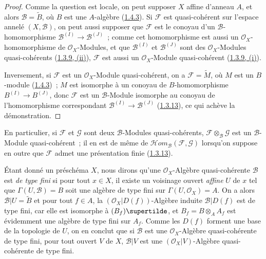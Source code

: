 \begin{proof}
Comme la question est locale, on peut supposer $X$ affine d'anneau $A$, et
alors $\mathscr{B}=\widetilde{B}$, où $B$ est une $A$-algèbre
(\hyperref[I.1.4.3-fr]{1.4.3}). Si $\mathscr{F}$ est quasi-cohérent sur
l'espace annelé $(X,\mathscr{B})$, on peut aussi supposer que
$\mathscr{F}$ est le conoyau d'un $\mathscr{B}$-homomorphisme
$\mathscr{B}^{(I)}\to\mathscr{B}^{(J)}$~; comme cet homomorphisme est
aussi un $\mathscr{O}_X$-homomorphisme de $\mathscr{O}_X$-Modules, et que
$\mathscr{B}^{(I)}$ et $\mathscr{B}^{(J)}$ sont des
$\mathscr{O}_X$-Modules quasi-cohérents
(\hyperref[I.1.3.9-fr]{1.3.9, (ii)}), $\mathscr{F}$ est aussi un
$\mathscr{O}_X$-Module quasi-cohérent
(\hyperref[I.1.3.9-fr]{1.3.9, (i)}).

Inversement, si $\mathscr{F}$ est un $\mathscr{O}_X$-Module
quasi-cohérent, on a $\mathscr{F}=\widetilde{M}$, où $M$ est un $B$-module
(\hyperref[I.1.4.3-fr]{1.4.3})~; $M$ est isomorphe à un conoyau de
$B$-homomorphisme $B^{(I)}\to B^{(J)}$, donc $\mathscr{F}$ est un
$\mathscr{B}$-Module isomorphe au conoyau de l'homomorphisme correspondant
$\mathscr{B}^{(I)}\to\mathscr{B}^{(J)}$
(\hyperref[I.1.3.13-fr]{1.3.13}), ce qui achève la démonstration.
\end{proof}

En particulier, si $\mathscr{F}$ et $\mathscr{G}$ sont deux
$\mathscr{B}$-Modules quasi-cohérents,
$\mathscr{F}\otimes_{\mathscr{B}}\mathscr{G}$ est un
$\mathscr{B}$-Module quasi-cohérent~; il en est de même de
$\mathscr{H}\!om_{\mathscr{B}}(\mathscr{F},\mathscr{G})$ lorsqu'on
suppose en outre que $\mathscr{F}$ admet une présentation finie
(\hyperref[I.1.3.13-fr]{1.3.13}).

\begin{env}[9.6.2]
\label{I.9.6.2-fr}
Étant donné un préschéma $X$, nous dirons qu'une
$\mathscr{O}_X$-Algèbre quasi-cohérente $\mathscr{B}$ est \emph{de
type fini} si pour tout $x\in X$, il existe un voisinage ouvert
\emph{affine} $U$ de $x$ tel que $\Gamma(U,\mathscr{B})=B$ soit une
algèbre de type fini sur $\Gamma(U,\mathscr{O}_X)=A$. On a alors
$\mathscr{B}|U=\widetilde{B}$ et pour tout $f\in A$, la
$(\mathscr{O}_X|D(f))$-Algèbre induite $\mathscr{B}|D(f)$ est de type
fini, car elle est isomorphe à $(B_f)\supertilde$, et
$B_f=B\otimes_A A_f$ est évidemment une algèbre de type fini sur $A_f$.
Comme les $D(f)$ forment une base de la topologie de $U$, on en conclut que
si $\mathscr{B}$ est une $\mathscr{O}_X$-Algèbre quasi-cohérente de type
fini, pour tout ouvert $V$ de $X$, $\mathscr{B}|V$ est une
$(\mathscr{O}_X|V)$-Algèbre quasi-cohérente de type fini.
\end{env}


